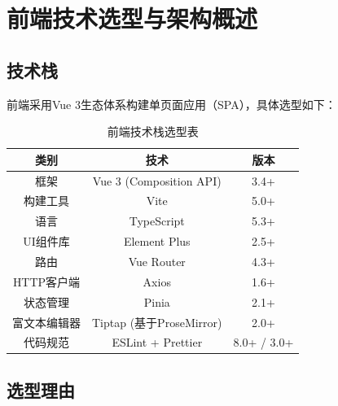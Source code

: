 
\section{前端技术选型与架构概述}

\subsection{技术栈}

前端采用Vue 3生态体系构建单页面应用（SPA），具体选型如下：

\begin{table}[htbp]
    \centering
    \caption{前端技术栈选型表}
    \begin{tabular}{|c|c|c|}
        \hline
        \textbf{类别} & \textbf{技术} & \textbf{版本} \\
        \hline
        框架 & Vue 3 (Composition API) & 3.4+ \\
        \hline
        构建工具 & Vite & 5.0+ \\
        \hline
        语言 & TypeScript & 5.3+ \\
        \hline
        UI组件库 & Element Plus & 2.5+ \\
        \hline
        路由 & Vue Router & 4.3+ \\
        \hline
        HTTP客户端 & Axios & 1.6+ \\
        \hline
        状态管理 & Pinia & 2.1+ \\
        \hline
        富文本编辑器 & Tiptap (基于ProseMirror) & 2.0+ \\
        \hline
        代码规范 & ESLint + Prettier & 8.0+ / 3.0+ \\
        \hline
    \end{tabular}
\end{table}

\subsection{选型理由}

